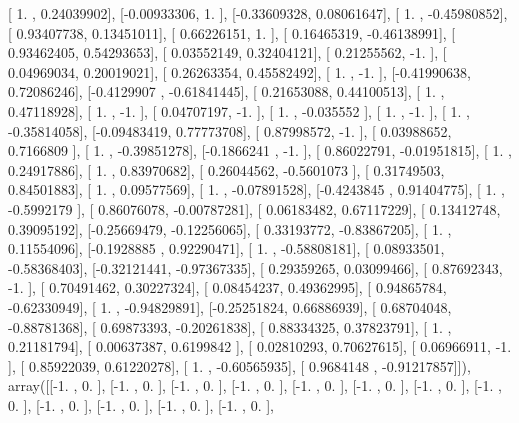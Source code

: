 \documentclass{article}
\begin{document}
       [ 1.        ,  0.24039902],
       [-0.00933306,  1.        ],
       [-0.33609328,  0.08061647],
       [ 1.        , -0.45980852],
       [ 0.93407738,  0.13451011],
       [ 0.66226151,  1.        ],
       [ 0.16465319, -0.46138991],
       [ 0.93462405,  0.54293653],
       [ 0.03552149,  0.32404121],
       [ 0.21255562, -1.        ],
       [ 0.04969034,  0.20019021],
       [ 0.26263354,  0.45582492],
       [ 1.        , -1.        ],
       [-0.41990638,  0.72086246],
       [-0.4129907 , -0.61841445],
       [ 0.21653088,  0.44100513],
       [ 1.        ,  0.47118928],
       [ 1.        , -1.        ],
       [ 0.04707197, -1.        ],
       [ 1.        , -0.035552  ],
       [ 1.        , -1.        ],
       [ 1.        , -0.35814058],
       [-0.09483419,  0.77773708],
       [ 0.87998572, -1.        ],
       [ 0.03988652,  0.7166809 ],
       [ 1.        , -0.39851278],
       [-0.1866241 , -1.        ],
       [ 0.86022791, -0.01951815],
       [ 1.        ,  0.24917886],
       [ 1.        ,  0.83970682],
       [ 0.26044562, -0.5601073 ],
       [ 0.31749503,  0.84501883],
       [ 1.        ,  0.09577569],
       [ 1.        , -0.07891528],
       [-0.4243845 ,  0.91404775],
       [ 1.        , -0.5992179 ],
       [ 0.86076078, -0.00787281],
       [ 0.06183482,  0.67117229],
       [ 0.13412748,  0.39095192],
       [-0.25669479, -0.12256065],
       [ 0.33193772, -0.83867205],
       [ 1.        ,  0.11554096],
       [-0.1928885 ,  0.92290471],
       [ 1.        , -0.58808181],
       [ 0.08933501, -0.58368403],
       [-0.32121441, -0.97367335],
       [ 0.29359265,  0.03099466],
       [ 0.87692343, -1.        ],
       [ 0.70491462,  0.30227324],
       [ 0.08454237,  0.49362995],
       [ 0.94865784, -0.62330949],
       [ 1.        , -0.94829891],
       [-0.25251824,  0.66886939],
       [ 0.68704048, -0.88781368],
       [ 0.69873393, -0.20261838],
       [ 0.88334325,  0.37823791],
       [ 1.        ,  0.21181794],
       [ 0.00637387,  0.6199842 ],
       [ 0.02810293,  0.70627615],
       [ 0.06966911, -1.        ],
       [ 0.85922039,  0.61220278],
       [ 1.        , -0.60565935],
       [ 0.9684148 , -0.91217857]]), array([[-1.        ,  0.        ],
       [-1.        ,  0.        ],
       [-1.        ,  0.        ],
       [-1.        ,  0.        ],
       [-1.        ,  0.        ],
       [-1.        ,  0.        ],
       [-1.        ,  0.        ],
       [-1.        ,  0.        ],
       [-1.        ,  0.        ],
       [-1.        ,  0.        ],
       [-1.        ,  0.        ],
       [-1.        ,  0.        ],
\end{document}
